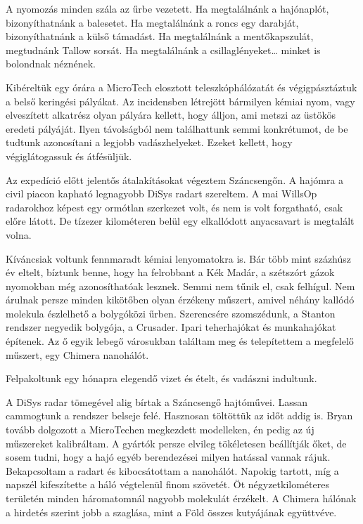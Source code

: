 \documentclass[10pt]{memoir}
\begin{document}
A nyomozás minden szála az űrbe vezetett. Ha megtalálnánk a hajónaplót,
bizonyíthatnánk a balesetet. Ha megtalálnánk a roncs egy darabját,
bizonyíthatnánk a külső támadást. Ha megtalálnánk a mentőkapszulát, megtudnánk
Tallow sorsát. Ha megtalálnánk a csillaglényeket… minket is bolondnak néznének.

Kibéreltük egy órára a MicroTech elosztott teleszkóphálózatát és
végigpásztáztuk a belső keringési pályákat. Az incidensben létrejött bármilyen
kémiai nyom, vagy elveszített alkatrész olyan pályára kellett, hogy álljon, ami
metszi az üstökös eredeti pályáját. Ilyen távolságból nem találhattunk semmi
konkrétumot, de be tudtunk azonosítani a legjobb vadászhelyeket. Ezeket
kellett, hogy végiglátogassuk és átfésüljük.

Az expedíció előtt jelentős átalakításokat végeztem Száncsengőn. A hajómra a
civil piacon kapható legnagyobb DiSys radart szereltem. A mai WillsOp
radarokhoz képest egy ormótlan szerkezet volt, és nem is volt forgatható, csak
előre látott. De tízezer kilométeren belül egy elkallódott anyacsavart is
megtalált volna.

Kíváncsiak voltunk fennmaradt kémiai lenyomatokra is. Bár több mint százhúsz év
eltelt, bíztunk benne, hogy ha felrobbant a Kék Madár, a szétszórt gázok
nyomokban még azonosíthatóak lesznek. Semmi nem tűnik el, csak felhígul. Nem
árulnak persze minden kikötőben olyan érzékeny műszert, amivel néhány kallódó
molekula észlelhető a bolygóközi űrben. Szerencsére szomszédunk, a Stanton
rendszer negyedik bolygója, a Crusader. Ipari teherhajókat és munkahajókat
építenek. Az ő egyik lebegő városukban találtam meg és telepítettem a megfelelő
műszert, egy Chimera nanohálót.

Felpakoltunk egy hónapra elegendő vizet és ételt, és vadászni indultunk.

A DiSys radar tömegével alig bírtak a Száncsengő hajtóművei. Lassan cammogtunk
a rendszer belseje felé. Hasznosan töltöttük az időt addig is. Bryan tovább
dolgozott a MicroTechen megkezdett modelleken, én pedig az új műszereket
kalibráltam. A gyártók persze elvileg tökéletesen beállítják őket, de sosem
tudni, hogy a hajó egyéb berendezései milyen hatással vannak rájuk.
Bekapcsoltam a radart és kibocsátottam a nanohálót. Napokig tartott, míg a
napszél kifeszítette a háló végtelenül finom szövetét. Öt négyzetkilométeres
területén minden háromatomnál nagyobb molekulát érzékelt. A Chimera hálónak a
hirdetés szerint jobb a szaglása, mint a Föld összes kutyájának együttvéve.
\end{document}
